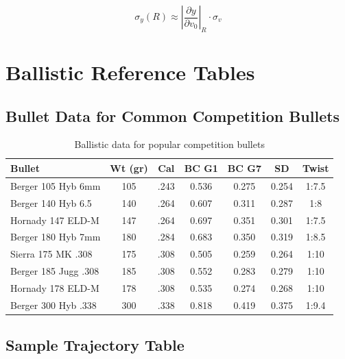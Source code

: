 \documentclass[11pt,twoside,openright]{report}
\begin{document}
\begin{equation}
  \sigma_y(R) \approx \left|\frac{\partial y}{\partial v_0}\right|_{R} \cdot \sigma_v
  \label{eq:vertical_sd}
\end{equation}


\chapter{Ballistic Reference Tables}
\label{ch:tables}

\section{Bullet Data for Common Competition Bullets}

\begin{table}[H]
\centering
\caption{Ballistic data for popular competition bullets \citep{litz2011applied, litz2015ballistic}}
\label{tab:bullet_data}
\small
\begin{tabular}{@{}lcccccc@{}}
\toprule
\textbf{Bullet} & \textbf{Wt (gr)} & \textbf{Cal} & \textbf{BC G1} & \textbf{BC G7} & \textbf{SD} & \textbf{Twist} \\
\midrule
Berger 105 Hyb 6mm & 105 & .243 & 0.536 & 0.275 & 0.254 & 1:7.5 \\
Berger 140 Hyb 6.5 & 140 & .264 & 0.607 & 0.311 & 0.287 & 1:8 \\
Hornady 147 ELD-M & 147 & .264 & 0.697 & 0.351 & 0.301 & 1:7.5 \\
Berger 180 Hyb 7mm & 180 & .284 & 0.683 & 0.350 & 0.319 & 1:8.5 \\
Sierra 175 MK .308 & 175 & .308 & 0.505 & 0.259 & 0.264 & 1:10 \\
Berger 185 Jugg .308 & 185 & .308 & 0.552 & 0.283 & 0.279 & 1:10 \\
Hornady 178 ELD-M & 178 & .308 & 0.535 & 0.274 & 0.268 & 1:10 \\
Berger 300 Hyb .338 & 300 & .338 & 0.818 & 0.419 & 0.375 & 1:9.4 \\
\bottomrule
\end{tabular}
\end{table}

\section{Sample Trajectory Table}
\end{document}
